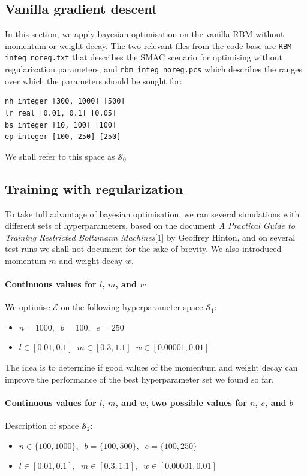 \documentclass[10pt,a4paper, twocolumn]{article}
\theoremstyle{definition}
\begin{document}
\subsection{Vanilla gradient descent}
In this section, we apply bayesian optimisation on the vanilla RBM without momentum or weight decay. The two relevant files from the code base are \texttt{RBM-integ\_noreg.txt} that describes the SMAC scenario for optimising without regularization parameters, and \texttt{rbm\_integ\_noreg.pcs} which describes the ranges over which the parameters should be sought for:
\begin{verbatim}
nh integer [300, 1000] [500]
lr real [0.01, 0.1] [0.05]
bs integer [10, 100] [100]
ep integer [100, 250] [250]
\end{verbatim}

We shall refer to this space as $\mathcal{S}_0$
\subsection{Training with regularization}
To take full advantage of bayesian optimisation, we ran several simulations with different sets of hyperparameters, based on the document \textit{A Practical Guide to Training Restricted Boltzmann
Machines}[1] by Geoffrey Hinton, and on several test runs we shall not document for the sake of brevity. We also introduced momentum $m$ and weight decay $w$.
\paragraph{Continuous values for $l$, $m$, and $w$}
We optimise $\mathcal{E}$ on the following hyperparameter space $\mathcal{S}_1$:
\begin{itemize}
\item $n = 1000, \; \; b = 100, \; \; e = 250$
\item $l \in [0.01, 0.1] \; \; m \in [0.3, 1.1] \; \; w \in [0.00001, 0.01]$
\end{itemize}
The idea is to determine if good values of the momentum and weight decay can improve the performance of the best hyperparameter set we found so far.
\paragraph{Continuous values for $l$, $m$, and $w$, two possible values for $n$, $e$, and $b$}
Description of space $\mathcal{S}_2$:
\begin{itemize}
\item $n \in \{100, 1000\}, \; \; b = \{100, 500\}, \; \; e = \{100, 250\}$
\item $l \in [0.01, 0.1], \; \; m \in [0.3, 1.1], \; \; w \in [0.00001, 0.01]$
\end{itemize}
\end{document}
